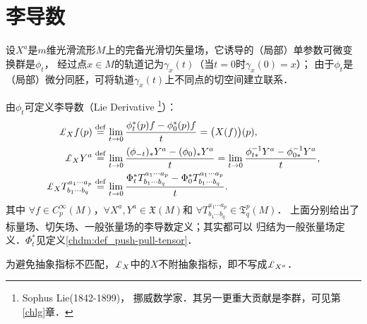 %



\section{李导数}\label{chdm:sec_Lie-Derivative}

设$X^a$是$m$维光滑流形$M$上的完备光滑切矢量场，它诱导的（局部）单参数可微变换群是$\phi_t$，
经过点$x\in M$的轨道记为$\gamma_x(t)$（当$t=0$时$\gamma_x(0)=x$）；
由于$\phi_t$是（局部）微分同胚，可将轨道$\gamma_x(t)$上不同点的切空间建立联系．

\begin{definition}
    由$\phi_t$可定义李导数（Lie Derivative {\footnote{Sophus Lie(1842-1899)，
            挪威数学家．其另一更重大贡献是李群，可见第\ref{chlg}章．}}）：
    \begin{align}
        \Lie_{X} f(p) &\overset{\mathrm {def}}{=} \lim_{t\to 0}
        \frac{\phi^{*}_{t}(p) f-\phi^{*}_{0}(p)f}{t} = \bigl(X(f)\bigr)(p), \label{chdm:def_LieD-scalar} \\
        \Lie_{X} Y^{a} &\overset{\mathrm {def}}{=} \lim_{t\to 0}
        \frac{(\phi_{-t})_{*} Y^{a}-(\phi_{0})_{*}Y^{a}}{t}=\lim_{t\to 0}
        \frac{\phi^{-1}_{t*} Y^{a}-\phi^{-1}_{0*}Y^{a}}{t},  \label{chdm:def_LieD-vector} \\
        \Lie_{X} T_{b_1\cdots b_q}^{a_1\cdots a_p} &\overset{\mathrm {def}}{=} \lim_{t\to 0}
        \frac{\Phi^{*}_{t} T_{b_1\cdots b_q}^{a_1\cdots a_p}-\Phi^{*}_{0}T_{b_1\cdots b_q}^{a_1\cdots a_p}}{t} .
          \label{chdm:def_LieD-tensor}
    \end{align}
    其中 $\forall f \in C^\infty_p(M)$，$\forall X^a, Y^{a} \in \mathfrak{X}(M) $和
    $\forall T_{b_1\cdots b_q}^{a_1\cdots a_p} \in \mathfrak{T}^p_q(M)$．
    上面分别给出了标量场、切矢场、一般张量场的李导数定义；其实都可以
    归结为一般张量场定义．$\Phi^{*}_{t}$见定义\ref{chdm:def_push-pull-tensor}．
\end{definition}

\begin{remark}\label{chdm:rek_lieabstnoa}
    为避免抽象指标不匹配，$\Lie_{X}$中的$X$不附抽象指标，即不写成$\Lie_{X^a}$．
\end{remark}


